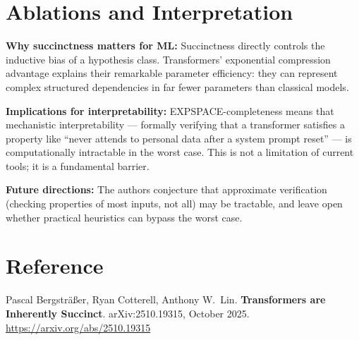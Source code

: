 \documentclass[10pt,twocolumn]{article}
\begin{document}
\section{Ablations and Interpretation}

\textbf{Why succinctness matters for ML:} Succinctness directly controls
the inductive bias of a hypothesis class. Transformers' exponential compression
advantage explains their remarkable parameter efficiency: they can represent
complex structured dependencies in far fewer parameters than classical models.

\textbf{Implications for interpretability:} EXPSPACE-completeness means
that mechanistic interpretability --- formally verifying that a transformer
satisfies a property like ``never attends to personal data after a system
prompt reset'' --- is computationally intractable in the worst case. This is
not a limitation of current tools; it is a fundamental barrier.

\textbf{Future directions:} The authors conjecture that approximate
verification (checking properties of most inputs, not all) may be tractable,
and leave open whether practical heuristics can bypass the worst case.

\section*{Reference}

Pascal Bergstr\"{a}\ss{}er, Ryan Cotterell, Anthony W.\ Lin.
\textbf{Transformers are Inherently Succinct}.
arXiv:2510.19315, October 2025.
\url{https://arxiv.org/abs/2510.19315}
\end{document}
